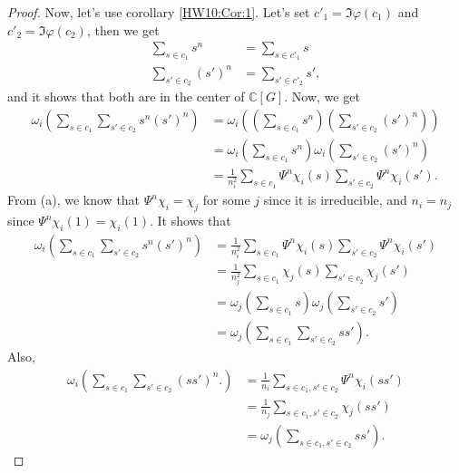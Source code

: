 \documentclass[a4paper, 12pt]{article}
\theoremstyle{Mydefinition}
\theoremstyle{Mytheorem}
\begin{document}
\begin{enumerate}
\begin{proof}
Now, let's use corollary \ref{HW10:Cor:1}. Let's set $c'_1 = \Im \varphi(c_1)$ and $c'_2 = \Im\varphi(c_2)$, then we get
\begin{equation}
\begin{split}
    \sum_{s\in c_1}s^n &= \sum_{s\in c'_1}s\\
    \sum_{s'\in c_2}(s')^n &=\sum_{s'\in c'_2}s',
\end{split}
\end{equation}
and it shows that both are in the center of $\mathbb{C}[G]$. Now, we get
\begin{equation}
\begin{split}
    \omega_i\left(\sum_{s\in c_1}\sum_{s'\in c_2}s^n(s')^n\right) &=\omega_i\left(\left(\sum_{s\in c_1}s^n\right)\left(\sum_{s'\in c_2}(s')^n\right)\right)\\
    &=\omega_i\left(\sum_{s\in c_1}s^n\right)\omega_i\left(\sum_{s'\in c_2}(s')^n\right)\\
    &=\frac{1}{n^2_i}\sum_{s\in c_1}\Psi^n\chi_i(s)\sum_{s'\in c_2}\Psi^n\chi_i(s').
\end{split}
\end{equation}
From (a), we know that $\Psi^n\chi_i = \chi_j$ for some $j$ since it is irreducible, and $n_i=n_j$ since $\Psi^n\chi_i(1) = \chi_i(1)$. It shows that
\begin{equation}
\begin{split}
    \omega_i\left(\sum_{s\in c_1}\sum_{s'\in c_2}s^n(s')^n\right) &=\frac{1}{n^2_i}\sum_{s\in c_1}\Psi^n\chi_i(s)\sum_{s'\in c_2}\Psi^n\chi_i(s')\\
    &=\frac{1}{n^2_j}\sum_{s\in c_1}\chi_j(s)\sum_{s'\in c_2}\chi_j(s')\\
    &=\omega_j\left(\sum_{s\in c_1}s\right)\omega_j\left(\sum_{s'\in c_2}s'\right)\\
    &=\omega_j\left(\sum_{s\in c_1}\sum_{s'\in c_2}ss'\right).
\end{split}
\end{equation}
Also,
\begin{equation}
    \begin{split}
        \omega_i\left(\sum_{s\in c_1}\sum_{s'\in c_2}(ss')^n.\right) &= \frac{1}{n_i}\sum_{s\in c_1,s'\in c_2}\Psi^n \chi_i(ss')\\
        &=\frac{1}{n_j}\sum_{s\in c_1,s'\in c_2}\chi_j(ss')\\
        &=\omega_j\left(\sum_{s\in c_1,s'\in c_2}ss'\right).
    \end{split}
\end{equation}

\end{proof}
\end{enumerate}
\end{document}
